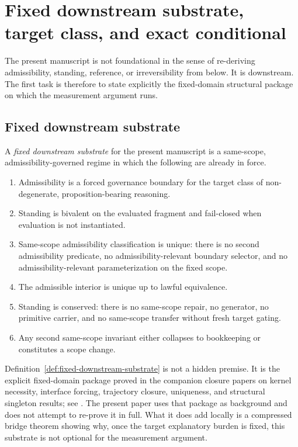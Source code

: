 \section{Fixed downstream substrate, target class, and exact conditional}
\label{sec:targetclass}

The present manuscript is not foundational in the sense of re-deriving admissibility, standing,
reference, or irreversibility from below. It is downstream. The first task is therefore to state
explicitly the fixed-domain structural package on which the measurement argument runs.

\subsection{Fixed downstream substrate}

\begin{definition}
\label{def:fixed-downstream-substrate}
A \emph{fixed downstream substrate} for the present manuscript is a same-scope, admissibility-governed
regime in which the following are already in force.
\begin{enumerate}
    \item Admissibility is a forced governance boundary for the target class of non-degenerate,
    proposition-bearing reasoning.
    \item Standing is bivalent on the evaluated fragment and fail-closed when evaluation is not
    instantiated.
    \item Same-scope admissibility classification is unique: there is no second admissibility
    predicate, no admissibility-relevant boundary selector, and no admissibility-relevant
    parameterization on the fixed scope.
    \item The admissible interior is unique up to lawful equivalence.
    \item Standing is conserved: there is no same-scope repair, no generator, no primitive carrier,
    and no same-scope transfer without fresh target gating.
    \item Any second same-scope invariant either collapses to bookkeeping or constitutes a scope
    change.
\end{enumerate}
\end{definition}

\begin{remark}
\label{rem:substrate-provenance}
Definition~\ref{def:fixed-downstream-substrate} is not a hidden premise. It is the explicit fixed-domain
package proved in the companion closure papers on kernel necessity, interface forcing, trajectory
closure, uniqueness, and structural singleton results; see
\citep{maley_foundational2026,maley_necessity2026,maley_trajectory2026,maley_unus2026,
maley_clausura2026,maley_ats2026,maley_ametric2026,maley_structura2026}. The present paper uses
that package as background and does not attempt to re-prove it in full. What it does add locally is a
compressed bridge theorem showing why, once the target explanatory burden is fixed, this substrate is
not optional for the measurement argument.
\end{remark}

